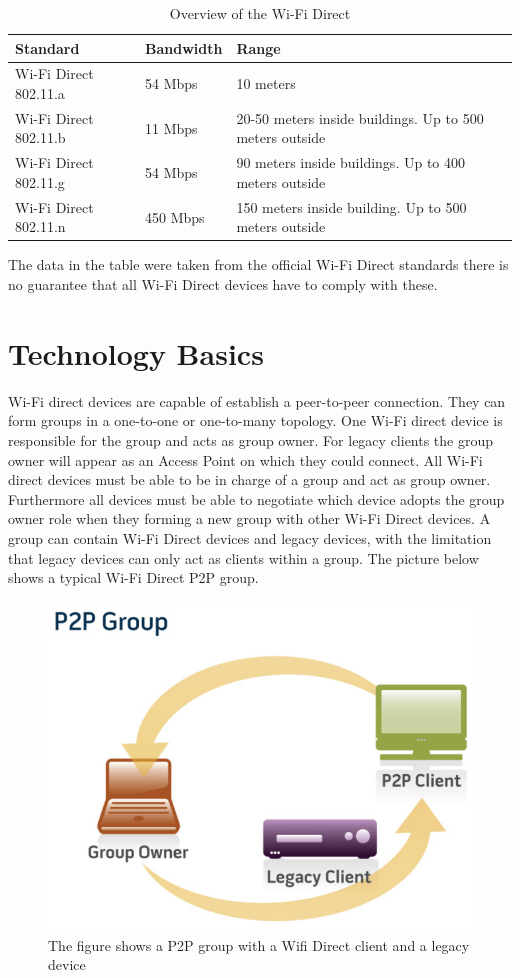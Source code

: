 \begin{center}
	\begin{table}[h]
    	\begin{tabular}{| l | l | p{6cm} |}
    	\hline
    	Standard & Bandwidth & Range\\ \hline
		Wi-Fi Direct 802.11.a & 54 Mbps & 10 meters \\ \hline
		Wi-Fi Direct 802.11.b & 11 Mbps & 20-50 meters inside buildings. \newline
		Up to 500 meters outside\\ \hline
		Wi-Fi Direct 802.11.g & 54 Mbps & 90 meters inside buildings. \newline
		Up to 400 meters outside\\ \hline
		Wi-Fi Direct 802.11.n & 450 Mbps & 150 meters inside building.\newline
		Up to 500 meters outside\\ \hline
    	\end{tabular}
    \caption{Overview of the Wi-Fi Direct\protect\cite{wifip2p1}}
    \label{table:Wi-Fi Direct}
    \end{table}
\end{center}
\noindent The data in the table were taken from the official Wi-Fi Direct standards there is no guarantee that all Wi-Fi Direct devices have to comply with these\cite{wifialliance}.
\section{Technology Basics}
\label{sec:TechnologyBascs}
Wi-Fi direct devices are capable of establish a peer-to-peer connection. They can form groups in a one-to-one or one-to-many topology. One Wi-Fi direct device is responsible for the group and acts as group owner. For legacy clients the group owner will appear as an Access Point on which they could connect.
All Wi-Fi direct devices must be able to be in charge of a group and act as group owner. Furthermore all devices must be able to negotiate which device adopts the group owner role when they forming a new group with other Wi-Fi Direct devices. A group can contain Wi-Fi Direct devices and legacy devices, with the limitation that legacy devices can only act as clients within a group. The picture below shows a typical Wi-Fi Direct P2P group\cite{wifialliance}.

\begin{figure}[!hb]
	\centering
  \includegraphics[width=0.8\linewidth]{images/wifidirect.eps}
	\caption{The figure shows a P2P group with a Wifi Direct client and a legacy device\cite{wifialliance}}
	\label{fig1}
\end{figure}